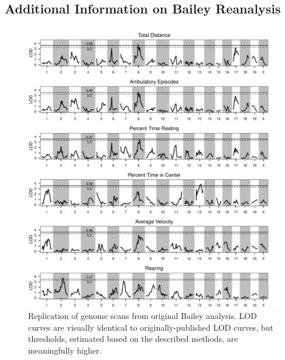     \subsection{Additional Information on Bailey Reanalysis}
        \begin{figure}
            \includegraphics[width=\textwidth]{images/bailey_replication_scanones.pdf}
            \caption{Replication of genome scans from original Bailey analysis. LOD curves are visually identical to originally-published LOD curves, but thresholds, estimated based on the described methods, are meaningfully higher.}
            \label{fig:Bailey_replicate}
        \end{figure}

